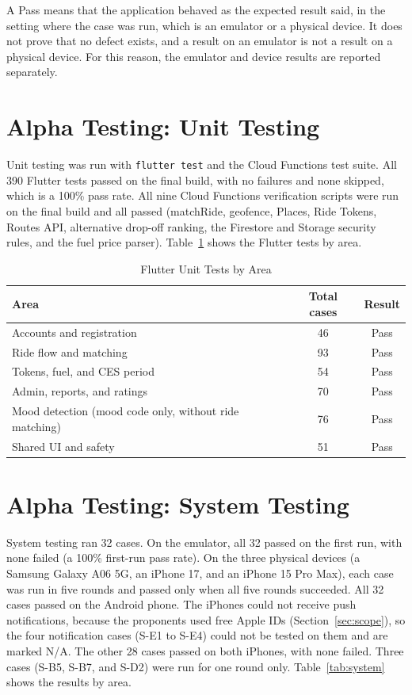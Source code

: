 A Pass means that the application behaved as the expected result said, in the setting where the case was run, which is an emulator or a physical device. It does not prove that no defect exists, and a result on an emulator is not a result on a physical device. For this reason, the emulator and device results are reported separately.

\section{Alpha Testing: Unit Testing}
\label{sec:unit-results}
Unit testing was run with \texttt{flutter test} and the Cloud Functions test suite. All 390 Flutter tests passed on the final build, with no failures and none skipped, which is a 100\% pass rate. All nine Cloud Functions verification scripts were run on the final build and all passed (matchRide, geofence, Places, Ride Tokens, Routes API, alternative drop-off ranking, the Firestore and Storage security rules, and the fuel price parser). Table~\ref{tab:unit} shows the Flutter tests by area.

\begin{table}[htbp]
    \centering
    \caption{Flutter Unit Tests by Area}
    \label{tab:unit}
    \small
    \renewcommand{\arraystretch}{1.2}
    \begin{tabular}{|l|c|c|}
        \hline
        \textbf{Area} & \textbf{Total cases} & \textbf{Result} \\
        \hline
        Accounts and registration & 46 & Pass \\
        Ride flow and matching & 93 & Pass \\
        Tokens, fuel, and CES period & 54 & Pass \\
        Admin, reports, and ratings & 70 & Pass \\
        Mood detection (mood code only, without ride matching) & 76 & Pass \\
        Shared UI and safety & 51 & Pass \\
        \hline
    \end{tabular}
\end{table}

\section{Alpha Testing: System Testing}
\label{sec:system-results}
System testing ran 32 cases. On the emulator, all 32 passed on the first run, with none failed (a 100\% first-run pass rate). On the three physical devices (a Samsung Galaxy A06 5G, an iPhone 17, and an iPhone 15 Pro Max), each case was run in five rounds and passed only when all five rounds succeeded. All 32 cases passed on the Android phone. The iPhones could not receive push notifications, because the proponents used free Apple IDs (Section~\ref{sec:scope}), so the four notification cases (S-E1 to S-E4) could not be tested on them and are marked N/A. The other 28 cases passed on both iPhones, with none failed. Three cases (S-B5, S-B7, and S-D2) were run for one round only. Table~\ref{tab:system} shows the results by area.

